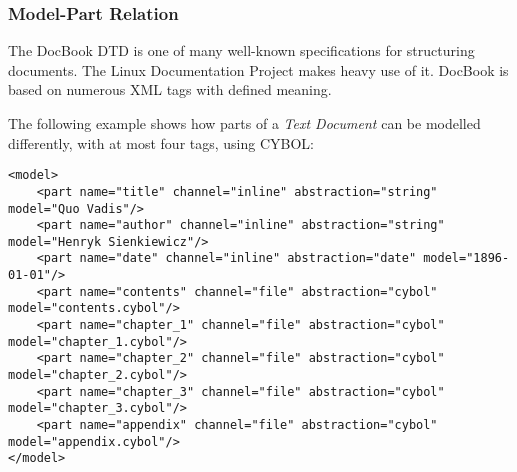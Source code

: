 %
%
%
%
%
%
%

\subsubsection{Model-Part Relation}
\label{model_part_relation_heading}

The DocBook DTD \cite{docbook} is one of many well-known specifications for
structuring documents. The Linux Documentation Project \cite{linuxdoc} makes
heavy use of it. DocBook is based on numerous XML tags with defined meaning.

The following example shows how parts of a \emph{Text Document} can be modelled
differently, with at most four tags, using CYBOL:

\begin{scriptsize}
    \begin{verbatim}
<model>
    <part name="title" channel="inline" abstraction="string" model="Quo Vadis"/>
    <part name="author" channel="inline" abstraction="string" model="Henryk Sienkiewicz"/>
    <part name="date" channel="inline" abstraction="date" model="1896-01-01"/>
    <part name="contents" channel="file" abstraction="cybol" model="contents.cybol"/>
    <part name="chapter_1" channel="file" abstraction="cybol" model="chapter_1.cybol"/>
    <part name="chapter_2" channel="file" abstraction="cybol" model="chapter_2.cybol"/>
    <part name="chapter_3" channel="file" abstraction="cybol" model="chapter_3.cybol"/>
    <part name="appendix" channel="file" abstraction="cybol" model="appendix.cybol"/>
</model>
    \end{verbatim}
\end{scriptsize}
